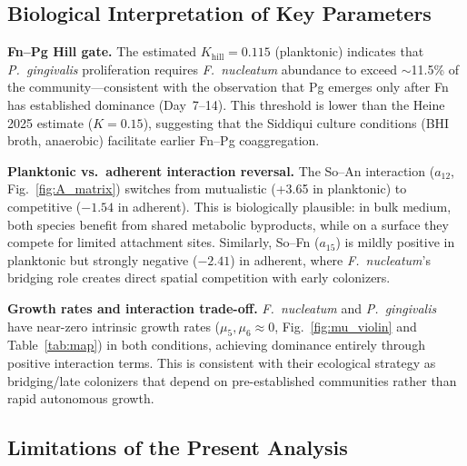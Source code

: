 \documentclass[11pt,a4paper]{article}
\begin{document}
\subsection{Biological Interpretation of Key Parameters}

\textbf{Fn--Pg Hill gate.}
The estimated $K_\mathrm{hill} = 0.115$ (planktonic) indicates that
\textit{P.\ gingivalis} proliferation requires \textit{F.\ nucleatum} abundance
to exceed $\sim$11.5\% of the community---consistent with the observation that
Pg emerges only after Fn has established dominance (Day~7--14). This threshold
is lower than the Heine 2025 estimate ($K = 0.15$), suggesting that the
Siddiqui culture conditions (BHI broth, anaerobic) facilitate earlier
Fn--Pg coaggregation.

\textbf{Planktonic vs.\ adherent interaction reversal.}
The So--An interaction ($a_{12}$, Fig.~\ref{fig:A_matrix}) switches from mutualistic
(+3.65 in planktonic) to competitive ($-1.54$ in adherent). This is biologically plausible:
in bulk medium, both species benefit from shared metabolic byproducts,
while on a surface they compete for limited attachment sites. Similarly,
So--Fn ($a_{15}$) is mildly positive in planktonic but strongly negative
($-2.41$) in adherent, where \textit{F.\ nucleatum}'s bridging role
creates direct spatial competition with early colonizers.

\textbf{Growth rates and interaction trade-off.}
\textit{F.\ nucleatum} and \textit{P.\ gingivalis} have near-zero intrinsic
growth rates ($\mu_5, \mu_6 \approx 0$, Fig.~\ref{fig:mu_violin} and
Table~\ref{tab:map}) in both conditions, achieving dominance entirely through
positive interaction terms. This is consistent with their
ecological strategy as bridging/late colonizers that depend on pre-established
communities rather than rapid autonomous growth.

\subsection{Limitations of the Present Analysis}
\end{document}
